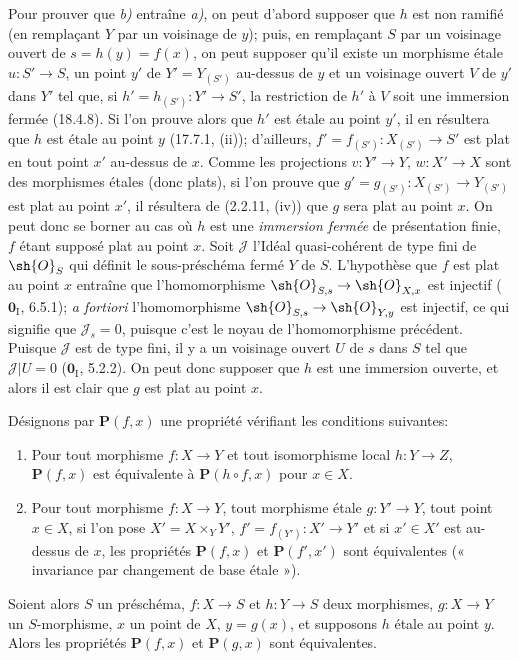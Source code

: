 Pour prouver que \emph{b)} entraîne \emph{a)}, on peut d'abord supposer que $h$ est non ramifié (en remplaçant $Y$ par un voisinage de $y$); puis, en remplaçant $S$ par un voisinage ouvert de $s=h(y)=f(x)$, on peut supposer qu'il existe un morphisme étale $u:S'\to S$, un point $y'$ de $Y'=Y_{(S')}$ au-dessus de $y$ et un voisinage ouvert $V$ de $y'$ dans $Y'$ tel que, si $h'=h_{(S')}:Y'\to S'$, la restriction de $h'$ à $V$ soit une immersion fermée (18.4.8). Si l'on prouve alors que $h'$ est étale au point $y'$, il en résultera que $h$ est étale au point $y$ (17.7.1, (ii)); d'ailleurs, $f'=f_{(S')}:X_{(S')}\to S'$ est plat en tout point $x'$ au-dessus de $x$. Comme les projections $v:Y'\to Y$, $w:X'\to X$ sont des morphismes étales (donc plats), si l'on prouve que $g'=g_{(S')}:X_{(S')}\to Y_{(S')}$ est plat au point $x'$, il résultera de (2.2.11, (iv)) que $g$ sera plat au point $x$. On peut donc se borner au cas où $h$ est une \emph{immersion fermée}
de présentation finie, $f$ étant supposé plat au point $x$. Soit $\mathscr J$ l'Idéal quasi-cohérent de type fini de $\sh{O}_S$ qui définit le sous-préschéma fermé $Y$ de $S$. L'hypothèse que $f$ est plat au point $x$ entraîne que l'homomorphisme $\sh{O}_{S,s}\to\sh{O}_{X,x}$ est injectif ($\mathbf{0}_{\mathrm I}$, 6.5.1); \emph{a fortiori} l'homomorphisme $\sh{O}_{S,s}\to\sh{O}_{Y,y}$ est injectif, ce qui signifie que $\mathscr J_s=0$, puisque c'est le noyau de l'homomorphisme précédent. Puisque $\mathscr J$ est de type fini, il y a un voisinage ouvert $U$ de $s$ dans $S$ tel que $\mathscr J|U=0$ ($\mathbf{0}_{\mathrm I}$, 5.2.2). On peut donc supposer que $h$ est une immersion ouverte, et alors il est clair que $g$ est plat au point $x$.

\begin{proposition}[18.4.10]
\label{IV.18.4.10}
Désignons par $\boldsymbol{P}(f,x)$ une propriété vérifiant les conditions suivantes:
\begin{enumerate}
  \item[$1^\circ$] Pour tout morphisme $f:X\to Y$ et tout isomorphisme local $h:Y\to Z$, $\boldsymbol{P}(f,x)$ est équivalente à $\boldsymbol{P}(h\circ f,x)$ pour $x\in X$.
  \item[$2^\circ$] Pour tout morphisme $f:X\to Y$, tout morphisme étale $g:Y'\to Y$, tout point $x\in X$, si l'on pose $X'=X\times_Y Y'$, $f'=f_{(Y')}:X'\to Y'$ et si $x'\in X'$ est au-dessus de $x$, les propriétés $\boldsymbol{P}(f,x)$ et $\boldsymbol{P}(f',x')$ sont équivalentes \textup{(« invariance par changement de base étale »)}.
\end{enumerate}

Soient alors $S$ un préschéma, $f:X\to S$ et $h:Y\to S$ deux morphismes, $g:X\to Y$ un $S$-morphisme, $x$ un point de $X$, $y=g(x)$, et supposons $h$ étale au point $y$. Alors les propriétés $\boldsymbol{P}(f,x)$ et $\boldsymbol{P}(g,x)$ sont équivalentes.
\end{proposition}

